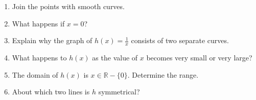\begin{wex}
{\begin{minipage}{\textwidth}
\begin{enumerate}[noitemsep, label=\textbf{\arabic*}. ] 
 \item Join the points with smooth curves.
\item What happens if $x=0$?
\item Explain why the graph of $h(x)=\frac{1}{x}$ consists of two separate curves.
\item What happens to $h(x)$ as the value of $x$ becomes very small or very large?
\item The domain of $h(x)$ is $x \in \mathbb{R} - \{0\}$. Determine the range.
\item About which two lines is $h$ symmetrical?
\end{enumerate}
\end{minipage}
}
{
}
\end{wex}
